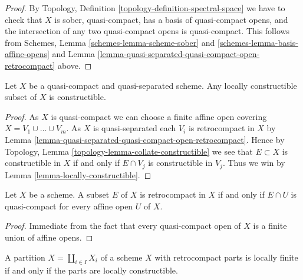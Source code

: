 \begin{proof}
By Topology, Definition \ref{topology-definition-spectral-space}
we have to check that $X$ is sober, quasi-compact, has a basis
of quasi-compact opens, and the intersection of any two
quasi-compact opens is quasi-compact. This follows from
Schemes, Lemma \ref{schemes-lemma-scheme-sober} and
\ref{schemes-lemma-basis-affine-opens}
and
Lemma \ref{lemma-quasi-separated-quasi-compact-open-retrocompact}
above.
\end{proof}

\begin{lemma}
\label{lemma-constructible-quasi-compact-quasi-separated}
Let $X$ be a quasi-compact and quasi-separated scheme.
Any locally constructible subset of $X$ is constructible.
\end{lemma}

\begin{proof}
As $X$ is quasi-compact we can choose a finite affine open covering
$X = V_1 \cup \ldots \cup V_m$. As $X$ is quasi-separated each $V_i$ is
retrocompact in $X$ by
Lemma \ref{lemma-quasi-separated-quasi-compact-open-retrocompact}.
Hence by
Topology, Lemma \ref{topology-lemma-collate-constructible}
we see that $E \subset X$ is constructible in $X$ if and only if
$E \cap V_j$ is constructible in $V_j$. Thus we win by
Lemma \ref{lemma-locally-constructible}.
\end{proof}

\begin{lemma}
\label{lemma-retrocompact}
Let $X$ be a scheme. A subset $E$ of $X$ is retrocompact in $X$ if and only if
$E \cap U$ is quasi-compact for every affine open $U$ of $X$.
\end{lemma}

\begin{proof}
Immediate from the fact that every quasi-compact open of $X$ is a finite
union of affine opens.
\end{proof}

\begin{lemma}
\label{lemma-stratification-locally-finite-constructible}
A partition $X = \coprod_{i \in I} X_i$ of a scheme $X$ with
retrocompact parts is locally finite if and only if the parts
are locally constructible.
\end{lemma}

